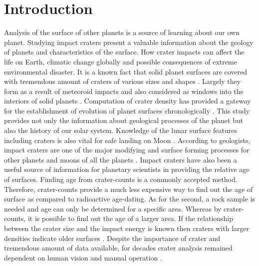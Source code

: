 \documentclass[11pt]{article}
\begin{document}


\section{Introduction}
Analysis of the surface of other planets is a source of learning about our own planet. Studying impact craters present a valuable information about the geology of planets and characteristics of the surface. How crater impacts can affect the life on Earth, climatic change globally and possible consequences of extreme environmental disaster. It is a known fact that solid planet surfaces are covered with tremendous amount of craters of various sizes and shapes \cite{melosh1988rocky}. Largely they form as a result of meteoroid impacts and also considered as windows into the interiors of solid planets \cite{honda2000crater}. Computation of crater density has provided a gateway for the establishment of evolution of planet surfaces chronologically \cite{martins2009crater}. This study provides not only the information about geological processes of the planet but also the history of our solar system. Knowledge of the lunar surface features including craters is also vital for safe landing on Moon \cite{ivanov2015probabilistic}. According to geologists, impact craters are one of the major modifying and surface forming processes for other planets and moons of all the planets \cite{koeberl1994african}. Impact craters have also been a useful source of information for planetary scientists in providing the relative age of surfaces. Finding age from crater-counts is a commonly accepted method. Therefore, crater-counts provide a much less expensive way to find out the age of surface as compared to radioactive age-dating. As for the second, a rock sample is needed and age can only be determined for a specific area. Whereas by crater-counts, it is possible to find out the age of a larger area. If the relationship between the crater size and the impact energy is known then craters with larger densities indicate older surfaces \cite{ivanov2002comparison}. Despite the importance of crater and tremendous amount of data available, for decades crater analysis remained dependent on human vision and manual operation \cite{honda2000crater}.
\end{document}
